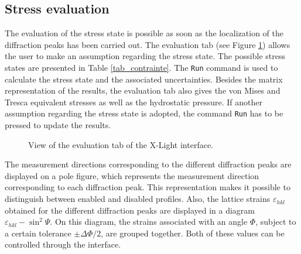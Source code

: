 \documentclass[french,a4paper]{report}
\begin{document}
\subsection{Stress evaluation}

The evaluation of the stress state is possible as soon as the localization of the diffraction peaks has been carried out. The evaluation tab (see Figure \ref{fig_evaluate}) allows the user to make an assumption regarding the stress state. The possible stress states are presented in Table \ref{tab_contrainte}. The \texttt{Run} command is used to calculate the stress state and the associated uncertainties. Besides the matrix representation of the results, the evaluation tab also gives the von Mises and Tresca equivalent stresses as well as the hydrostatic pressure. If another assumption regarding the stress state is adopted, the command \texttt{Run} has to be pressed to update the results.


\begin{figure}[th!]
\centering
{}
\caption{View of the evaluation tab of the X-Light interface.}
\label{fig_evaluate}
\end{figure}

The measurement directions corresponding to the different diffraction peaks are displayed on a pole figure, which represents the measurement direction corresponding to each diffraction peak. This representation makes it possible to distinguish between enabled and disabled profiles. Also, the lattice strains $\varepsilon_{hkl}$ obtained for the different diffraction peaks are displayed in a diagram $\varepsilon_{hkl}-\sin^2 \Psi$. On this diagram, the strains associated with an angle $\Phi$, subject to a certain tolerance $\pm \Delta \Phi/2$, are grouped together. Both of these values can be controlled through the interface.
\end{document}
